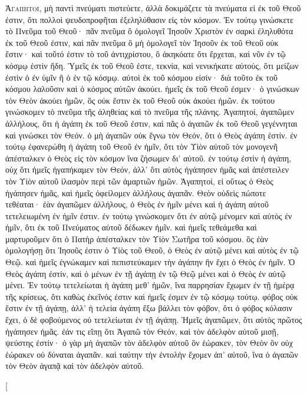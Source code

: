 \begin{pages}
    \begin{Rightside}
        \beginnumbering
		\renewcommand{\LettrineFontHook}{\PHtitl}
		\lettrine[lines=3]{Ἀ}{γαπητοί}, μὴ παντὶ πνεύματι πιστεύετε, ἀλλὰ δοκιμάζετε τὰ πνεύματα εἰ ἐκ τοῦ Θεοῦ ἐστιν, ὅτι πολλοὶ ψευδοπροφῆται ἐξεληλύθασιν εἰς τὸν κόσμον. Ἐν τούτῳ γινώσκετε τὸ Πνεῦμα τοῦ Θεοῦ· πᾶν πνεῦμα ὃ ὁμολογεῖ Ἰησοῦν Χριστὸν ἐν σαρκὶ ἐληλυθότα ἐκ τοῦ Θεοῦ ἐστιν, καὶ πᾶν πνεῦμα ὃ μὴ ὁμολογεῖ τὸν Ἰησοῦν ἐκ τοῦ Θεοῦ οὐκ ἔστιν· καὶ τοῦτό ἐστιν τὸ τοῦ ἀντιχρίστου, ὃ ἀκηκόατε ὅτι ἔρχεται, καὶ νῦν ἐν τῷ κόσμῳ ἐστὶν ἤδη. Ὑμεῖς ἐκ τοῦ Θεοῦ ἐστε, τεκνία, καὶ νενικήκατε αὐτούς, ὅτι μείζων ἐστὶν ὁ ἐν ὑμῖν ἢ ὁ ἐν τῷ κόσμῳ. αὐτοὶ ἐκ τοῦ κόσμου εἰσίν· διὰ τοῦτο ἐκ τοῦ κόσμου λαλοῦσιν καὶ ὁ κόσμος αὐτῶν ἀκούει. ἡμεῖς ἐκ τοῦ Θεοῦ ἐσμεν· ὁ γινώσκων τὸν Θεὸν ἀκούει ἡμῶν, ὃς οὐκ ἔστιν ἐκ τοῦ Θεοῦ οὐκ ἀκούει ἡμῶν. ἐκ τούτου γινώσκομεν τὸ πνεῦμα τῆς ἀληθείας καὶ τὸ πνεῦμα τῆς πλάνης.
		\pend
		\pstart
	 	Ἀγαπητοί, ἀγαπῶμεν ἀλλήλους, ὅτι ἡ ἀγάπη ἐκ τοῦ Θεοῦ ἐστιν, καὶ πᾶς ὁ ἀγαπῶν ἐκ τοῦ Θεοῦ γεγέννηται καὶ γινώσκει τὸν Θεόν. ὁ μὴ ἀγαπῶν οὐκ ἔγνω τὸν Θεόν, ὅτι ὁ Θεὸς ἀγάπη ἐστίν. ἐν τούτῳ ἐφανερώθη ἡ ἀγάπη τοῦ Θεοῦ ἐν ἡμῖν, ὅτι τὸν Υἱὸν αὐτοῦ τὸν μονογενῆ ἀπέσταλκεν ὁ Θεὸς εἰς τὸν κόσμον ἵνα ζήσωμεν δι’ αὐτοῦ. ἐν τούτῳ ἐστὶν ἡ ἀγάπη, οὐχ ὅτι ἡμεῖς ἠγαπήκαμεν τὸν Θεόν, ἀλλ’ ὅτι αὐτὸς ἠγάπησεν ἡμᾶς καὶ ἀπέστειλεν τὸν Υἱὸν αὐτοῦ ἱλασμὸν περὶ τῶν ἁμαρτιῶν ἡμῶν. Ἀγαπητοί, εἰ οὕτως ὁ Θεὸς ἠγάπησεν ἡμᾶς, καὶ ἡμεῖς ὀφείλομεν ἀλλήλους ἀγαπᾶν. Θεὸν οὐδεὶς πώποτε τεθέαται· ἐὰν ἀγαπῶμεν ἀλλήλους, ὁ Θεὸς ἐν ἡμῖν μένει καὶ ἡ ἀγάπη αὐτοῦ τετελειωμένη ἐν ἡμῖν ἐστιν. ἐν τούτῳ γινώσκομεν ὅτι ἐν αὐτῷ μένομεν καὶ αὐτὸς ἐν ἡμῖν, ὅτι ἐκ τοῦ Πνεύματος αὐτοῦ δέδωκεν ἡμῖν. καὶ ἡμεῖς τεθεάμεθα καὶ μαρτυροῦμεν ὅτι ὁ Πατὴρ ἀπέσταλκεν τὸν Υἱὸν Σωτῆρα τοῦ κόσμου. ὃς ἐὰν ὁμολογήσῃ ὅτι Ἰησοῦς ἐστιν ὁ Υἱὸς τοῦ Θεοῦ, ὁ Θεὸς ἐν αὐτῷ μένει καὶ αὐτὸς ἐν τῷ Θεῷ. καὶ ἡμεῖς ἐγνώκαμεν καὶ πεπιστεύκαμεν τὴν ἀγάπην ἣν ἔχει ὁ Θεὸς ἐν ἡμῖν. Ὁ Θεὸς ἀγάπη ἐστίν, καὶ ὁ μένων ἐν τῇ ἀγάπῃ ἐν τῷ Θεῷ μένει καὶ ὁ Θεὸς ἐν αὐτῷ μένει. Ἐν τούτῳ τετελείωται ἡ ἀγάπη μεθ’ ἡμῶν, ἵνα παρρησίαν ἔχωμεν ἐν τῇ ἡμέρᾳ τῆς κρίσεως, ὅτι καθὼς ἐκεῖνός ἐστιν καὶ ἡμεῖς ἐσμεν ἐν τῷ κόσμῳ τούτῳ. φόβος οὐκ ἔστιν ἐν τῇ ἀγάπῃ, ἀλλ’ ἡ τελεία ἀγάπη ἔξω βάλλει τὸν φόβον, ὅτι ὁ φόβος κόλασιν ἔχει, ὁ δὲ φοβούμενος οὐ τετελείωται ἐν τῇ ἀγάπῃ. Ἡμεῖς ἀγαπῶμεν, ὅτι αὐτὸς πρῶτος ἠγάπησεν ἡμᾶς. ἐάν τις εἴπῃ ὅτι Ἀγαπῶ τὸν Θεόν, καὶ τὸν ἀδελφὸν αὐτοῦ μισῇ, ψεύστης ἐστίν· ὁ γὰρ μὴ ἀγαπῶν τὸν ἀδελφὸν αὐτοῦ ὃν ἑώρακεν, τὸν Θεὸν ὃν οὐχ ἑώρακεν οὐ δύναται ἀγαπᾶν. καὶ ταύτην τὴν ἐντολὴν ἔχομεν ἀπ’ αὐτοῦ, ἵνα ὁ ἀγαπῶν τὸν Θεὸν ἀγαπᾷ καὶ τὸν ἀδελφὸν αὐτοῦ.
		\pend
        \endnumbering
    \end{Rightside}
    \begin{Leftside}
        \beginnumbering
        \pstart[

\end{Leftside}
\end{pages}
